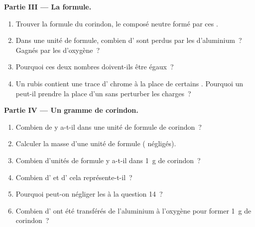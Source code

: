 \begin{problem}
\medskip
\noindent\textbf{Partie III --- La formule.}
\begin{enumerate}[resume]
  \item Trouver la formule du corindon, le composé neutre formé par ces
        .
  \item Dans une unité de formule, combien d' sont perdus par les
         d'aluminium~? Gagnés par les  d'oxygène~?
  \item Pourquoi ces deux nombres doivent-ils être égaux~?
  \item Un rubis contient une trace d' chrome  à la place
        de certains  . Pourquoi un  
        peut-il prendre la place d'un   sans perturber
        les charges~?
\end{enumerate}

\medskip
\noindent\textbf{Partie IV --- Un gramme de corindon.}
\begin{enumerate}[resume]
  \item Combien de  y a-t-il dans une unité de formule de
        corindon~?
  \item Calculer la masse d'une unité de formule ( négligés).
  \item Combien d'unités de formule y a-t-il dans \qty{1}{g} de
        corindon~?
  \item Combien d'  et d'  cela
        représente-t-il~?
  \item Pourquoi peut-on négliger les  à la question 14~?
  \item Combien d' ont été transférés de l'aluminium à
        l'oxygène pour former \qty{1}{g} de corindon~?
\end{enumerate}
\end{problem}
